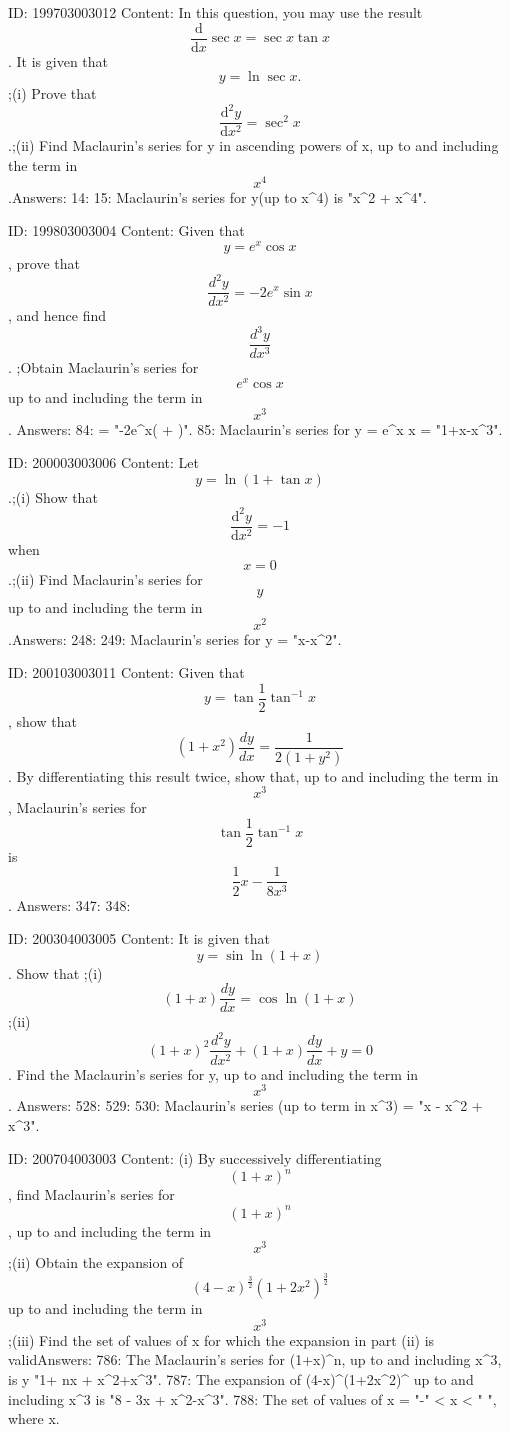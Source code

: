 \documentclass{article}
\begin{document}
ID: 199703003012
Content:
In this question, you may use the result \[\frac{\mathrm{d} }{\mathrm{d} x} \sec x = \sec x \tan x\]. It is given that \[y = \ln \sec x.\];(i) Prove that \[\frac{\mathrm{d}^{2} y}{\mathrm{d} x^{2}} = \sec^{2}x\].;(ii) Find Maclaurin's series for y in ascending powers of x, up to and including the term in \[x^{4}\].Answers:
14: 
15: Maclaurin's series for y(up to x^4) is "x^2 + x^4".

ID: 199803003004
Content:
Given that $$y = e^x \cos x$$, prove that $$\frac{d^2 y}{d x^2} = - 2 e^x \sin x$$, and hence find $$\frac{d^3 y}{d x^3}$$.  ;Obtain Maclaurin's series for $$e^x \cos x$$ up to and including the term in $$x^3$$. Answers:
84:  = "-2e^x( + )".
85: Maclaurin's series for y = e^x \cos x = "1+x-x^3".

ID: 200003003006
Content:
Let \[y = \ln (1 + \tan x)\].;(i) Show that \[\frac{\mathrm{d}^2 y}{\mathrm{d} x^2} = -1\] when $$x = 0$$.;(ii) Find Maclaurin's series for $$y$$ up to and including the term in \[x^2\].Answers:
248: 
249: Maclaurin's series for y = "x-x^2".

ID: 200103003011
Content:
Given that  $$y = \tan \frac{1}{2} \tan ^{-1} x$$, show that $$(1+x^2)\frac{dy}{dx} = \frac{1}{2(1 + y^2)}$$. By differentiating this result twice, show that, up to and including the term in  $$x^3$$, Maclaurin's series for  $$\tan \frac{1}{2} \tan ^{-1} x$$ is $$\frac{1}{2}x - \frac{1}{8x^3}$$. Answers:
347: 
348: 

ID: 200304003005
Content:
It is given that $$y = \sin{\ln (1 + x)}$$. Show that ;(i) $$( 1 + x )\frac{dy}{dx}= \cos {\ln ( 1 + x )}$$;(ii) $$( 1 + x )^2 \frac{d^2 y}{dx^2} + (1 + x)\frac{dy}{dx} + y = 0$$. Find the Maclaurin's series for y, up to and including the term in  $$x^3 $$.  Answers:
528: 
529: 
530: Maclaurin's series (up to term in x^3) = "x - x^2 + x^3".

ID: 200704003003
Content:
(i) By successively differentiating $$(1+x)^n$$, find Maclaurin's series for $$(1+x)^n$$, up to and including the term in $$x^3$$;(ii) Obtain the expansion of $$(4-x)^{\frac{3}{2}}(1+2x^2)^{\frac{3}{2}}$$ up to and including the term in $$x^3$$;(iii) Find the set of values of x for which the expansion in part (ii) is validAnswers:
786: The Maclaurin's series for (1+x)^n, up to and including x^3, is y \approx"1+ nx + x^2+x^3".
787: The expansion of (4-x)^{(1+2x^2)^{} } up to and including x^3 is "8 - 3x + x^2-x^3".
788: The set of values of x = "-" < x < " ", where x\in {}.
\end{document}
